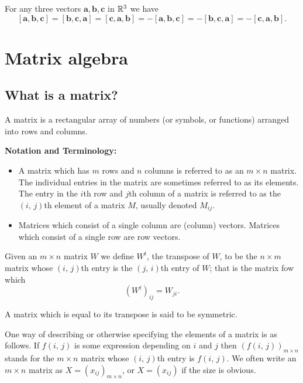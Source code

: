 \documentclass[10pt, a4paper]{article}
\newcommand{\mbf}[1]{\mathbf{#1}}
\begin{document}
\begin{lemma}
    For any three vectors $\mbf{a, b, c}$ in $\mathbb{R} ^ 3$ we have
    \[
    [\mbf{a, b, c}] = [\mbf{b, c, a}] = [\mbf{c, a, b}] = -[\mbf{a, b, c}] = -[\mbf{b, c, a}] = -[\mbf{c, a, b}].
    \]
\end{lemma}

\section{Matrix algebra}

\subsection{What is a matrix?}

\begin{definition}[Matrix]
    A matrix is a rectangular array of numbers (or symbols, or functions) arranged into rows and columns.
\end{definition}

\textbf{Notation and Terminology:}
\begin{itemize}
    \item A matrix which has $m$ rows and $n$ columns is referred to as an $m \times n$ matrix. The individual entries in the matrix are sometimes referred to as its elements. The entry in the $i$th row and $j$th column of a matrix is referred to as the $(i,\,j)$th element of a matrix $M$, usually denoted $M_{ij}$.
    \item Matrices which consist of a single column are (column) vectors. Matrices which consist of a single row are row vectors.
\end{itemize}

\begin{definition}[Transpose]
    Given an $m \times n$ matrix $W$ we define $W ^ t$, the transpose of $W$, to be the $n \times m$ matrix whose $(i,\,j)$th entry is the $(j,\,i)$th entry of $W$; that is the matrix fow which
    \[
    (W ^ t)_{ij} = W_{ji}.
    \]
\end{definition}

A matrix which is equal to its transpose is said to be symmetric.

One way of describing or otherwise specifying the elements of a matrix is as follows. If $f(i,\,j)$ is some expression depending on $i$ and $j$ then $(f(i,\,j))_{m \times n}$ stands for the $m \times n$ matrix whose $(i,\,j)$th entry is $f(i,\,j)$. We often write an $m \times n$ matrix as $X = (x_{ij})_{m \times n}$, or $X = (x_{ij})$ if the size is obvious.
\end{document}
